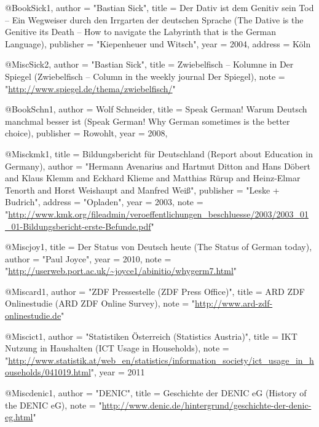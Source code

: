@Book{Sick1,
  author =	 "Bastian Sick",
  title =	 {{Der Dativ ist dem Genitiv sein Tod -- Ein Wegweiser
                  durch den Irrgarten der deutschen Sprache (The
                  Dative is the Genitive its Death -- How to navigate
                  the Labyrinth that is the German Language)}},
  publisher =	 "Kiepenheuer und Witsch",
  year =	 2004,
  address =	 {K{\"o}ln}
}

@Misc{Sick2,
  author =	 "Bastian Sick",
  title =	 {{Zwiebelfisch -- Kolumne in Der Spiegel (Zwiebelfisch --
                  Column in the weekly journal Der Spiegel)}},
  note =	 "\url{http://www.spiegel.de/thema/zwiebelfisch/}" 
}

@Book{Schn1,
  author =	 {Wolf Schneider},
  title =	 {{Speak German! Warum Deutsch manchmal besser ist
                  (Speak German! Why German sometimes is the better
                  choice)}},
  publisher =	 {Rowohlt},
  year =	 2008,
}



@Misc{kmk1,
  title =	 {{Bildungsbericht f{\"u}r Deutschland (Report about
                  Education in Germany)}},
  author =	 "Hermann Avenarius and Hartmut Ditton and Hans Döbert
                  and Klaus Klemm and Eckhard Klieme and Matthias
                  Rürup and Heinz-Elmar Tenorth and Horst Weishaupt
                  and Manfred Weiß",
  publisher =	 "Leske + Budrich",
  address =	 "Opladen",
  year =	 2003,
  note =
                  "\url{http://www.kmk.org/fileadmin/veroeffentlichungen_beschluesse/2003/2003_01_01-Bildungsbericht-erste-Befunde.pdf}"
}

@Misc{joy1,
  title =	 {{Der Status von Deutsch heute (The Status of German
                  today)}},
  author =	 "Paul Joyce",
  year =	 2010,
  note =
                  "\url{http://userweb.port.ac.uk/~joyce1/abinitio/whygerm7.html}"
}

@Misc{ard1,
  author =	 "ZDF Pressestelle (ZDF Press Office)",
  title =	 {{ARD ZDF Onlinestudie (ARD ZDF Online Survey)}},
  note =	 "\url{http://www.ard-zdf-onlinestudie.de}"
}

@Misc{ict1,
  author =	 "Statistiken Österreich (Statistics Austria)",
  title =	 {{IKT Nutzung in Haushalten (ICT Usage in
                  Households)}},
  note =
                  "\url{http://www.statistik.at/web_en/statistics/information_society/ict_usage_in_households/041019.html}",
  year =	 2011
}

@Misc{denic1,
  author =	 "DENIC",
  title =	 {{Geschichte der DENIC eG (History of the DENIC eG)}},
  note =
                  "\url{http://www.denic.de/hintergrund/geschichte-der-denic-eg.html}"
}


